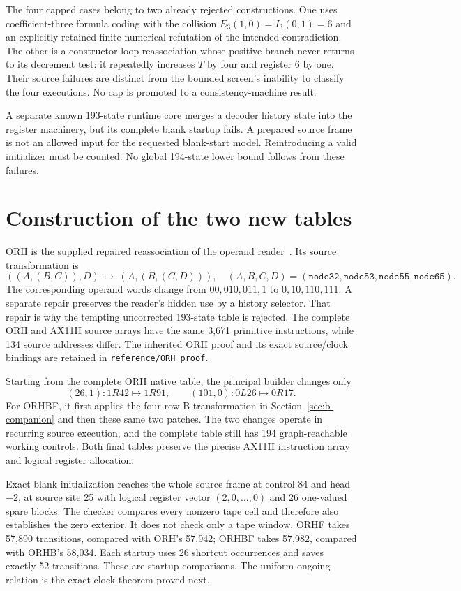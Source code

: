 \documentclass[11pt]{article}
\begin{document}
The four capped cases belong to two already rejected constructions. One uses coefficient-three formula coding with the collision $E_3(1,0)=I_3(0,1)=6$ and an explicitly retained finite numerical refutation of the intended contradiction. The other is a constructor-loop reassociation whose positive branch never returns to its decrement test: it repeatedly increases $T$ by four and register 6 by one. Their source failures are distinct from the bounded screen's inability to classify the four executions. No cap is promoted to a consistency-machine result.

A separate known 193-state runtime core merges a decoder history state into the register machinery, but its complete blank startup fails. A prepared source frame is not an allowed input for the requested blank-start model. Reintroducing a valid initializer must be counted. No global 194-state lower bound follows from these failures.

\section{Construction of the two new tables}
ORH is the supplied repaired reassociation of the operand reader~\cite{orh}. Its source transformation is
\[
 ((A,(B,C)),D)\ \longmapsto\ (A,(B,(C,D))),
\quad
 (A,B,C,D)=(\texttt{node32},\texttt{node53},\texttt{node55},\texttt{node65}).
\]
The corresponding operand words change from $00,010,011,1$ to $0,10,110,111$. A separate repair preserves the reader's hidden use by a history selector. That repair is why the tempting uncorrected 193-state table is rejected. The complete ORH and AX11H source arrays have the same 3,671 primitive instructions, while 134 source addresses differ. The inherited ORH proof and its exact source/clock bindings are retained in \texttt{reference/ORH\_proof}.

Starting from the complete ORH native table, the principal builder changes only
\[
        (26,1):1R42\mapsto1R91,\qquad
        (101,0):0L26\mapsto0R17.
\]
For ORHBF, it first applies the four-row B transformation in Section~\ref{sec:b-companion} and then these same two patches. The two changes operate in recurring source execution, and the complete table still has 194 graph-reachable working controls. Both final tables preserve the precise AX11H instruction array and logical register allocation.

Exact blank initialization reaches the whole source frame at control 84 and head $-2$, at source site 25 with logical register vector $(2,0,\ldots,0)$ and 26 one-valued spare blocks. The checker compares every nonzero tape cell and therefore also establishes the zero exterior. It does not check only a tape window. ORHF takes 57,890 transitions, compared with ORH's 57,942; ORHBF takes 57,982, compared with ORHB's 58,034. Each startup uses 26 shortcut occurrences and saves exactly 52 transitions. These are startup comparisons. The uniform ongoing relation is the exact clock theorem proved next.
\end{document}
